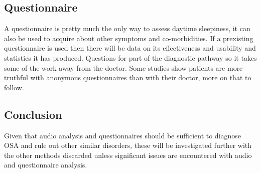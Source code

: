 \subsection{Questionnaire}
A questionnaire is pretty much the only way to assess daytime sleepiness, it can also be used to acquire about other symptoms and co-morbidities. If a prexisting questionnaire is used then there will be data on its effectiveness and usability and statistics it has produced. Questions for part of the diagnostic pathway so it takes some of the work away from the doctor. Some studies show patients are more truthful with anonymous questionnaires than with their doctor, more on that to follow.

\subsection{Conclusion}
Given that audio analysis and questionnaires should be sufficient to diagnose OSA and rule out other similar disorders, these will be investigated further with the other methods discarded unless significant issues are encountered with audio and questionnaire analysis.